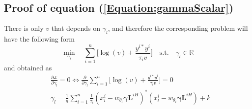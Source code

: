 \vspace{-1cm}
\subsection{Proof of equation (\ref{Equation:gammaScalar})} %
\noindent
There is only $v$ that depends on $\gamma_l$, and therefore the corresponding problem will have the following form 
\begin{equation*}
     \min_{\gamma_{l}} \quad \sum_{i=1}^n \Bigg[ \log\left( v \right) + \frac{y^{i*} y^i}{\tau_i v}  \Bigg] %
    \quad \text{s.t.} \quad  \gamma_{l}   \in \mathbb{R}
\end{equation*} 
\vspace{-0.3cm}
and obtained as
\vspace{-0.5cm}
\begin{align*}
    &\frac{\partial \mathcal{L}}{\partial \gamma_l} = 0 \Longleftrightarrow
    \frac{\partial }{\partial \gamma_l} \sum_{i=1}^n \Bigg[\log( v) + \frac{y^{i*} y^i}{\tau_i v} \Bigg] = 0 \\
    &\gamma_{l} = \frac{1}{n} \sum_{i=1}^n \frac{1}{\tau_i} (x_{l}^i - w_{\theta_{l}} \boldsymbol{\gamma} \mathbf{L}^{iH})^*(x_{l}^i - w_{\theta_{l}} \boldsymbol{\gamma} \mathbf{L}^{iH}) + k
\end{align*}    

